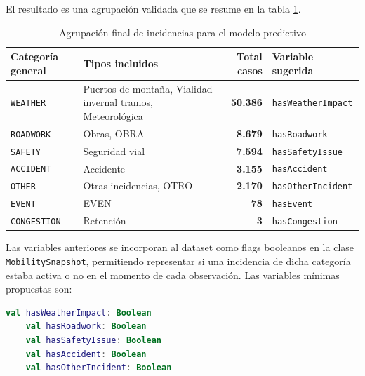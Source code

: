 El resultado es una agrupación validada que se resume en la tabla \ref{tab:agrupacion_incidencias}.

\begin{table}[H]
	\centering
	\small
	\caption{Agrupación final de incidencias para el modelo predictivo}
	\label{tab:agrupacion_incidencias}
	\begin{tabularx}{\textwidth}{lXrX}
		\toprule
		\textbf{Categoría general} & \textbf{Tipos incluidos} & \textbf{Total casos} & \textbf{Variable sugerida} \\
		\midrule
		\texttt{WEATHER}    & Puertos de montaña, Vialidad invernal tramos, Meteorológica & \textbf{50.386} & \texttt{hasWeatherImpact} \\
		\texttt{ROADWORK}   & Obras, OBRA                                                  & \textbf{8.679}  & \texttt{hasRoadwork} \\
		\texttt{SAFETY}     & Seguridad vial                                               & \textbf{7.594}  & \texttt{hasSafetyIssue} \\
		\texttt{ACCIDENT}   & Accidente                                                    & \textbf{3.155}  & \texttt{hasAccident} \\
		\texttt{OTHER}      & Otras incidencias, OTRO                                      & \textbf{2.170}  & \texttt{hasOtherIncident} \\
		\texttt{EVENT}      & EVEN                                                         & \textbf{78}     & \texttt{hasEvent} \\
		\texttt{CONGESTION} & Retención                                                    & \textbf{3}      & \texttt{hasCongestion} \\
		\bottomrule
	\end{tabularx}
\end{table}

Las variables anteriores se incorporan al dataset como flags booleanos en la clase \texttt{MobilitySnapshot}, permitiendo representar si una incidencia de dicha categoría estaba activa o no en el momento de cada observación. Las variables mínimas propuestas son:

\begin{lstlisting}[language=Kotlin, caption={Variables mínimas de incidencias en MobilitySnapshot}]
	val hasWeatherImpact: Boolean
	val hasRoadwork: Boolean
	val hasSafetyIssue: Boolean
	val hasAccident: Boolean
	val hasOtherIncident: Boolean
\end{lstlisting}

